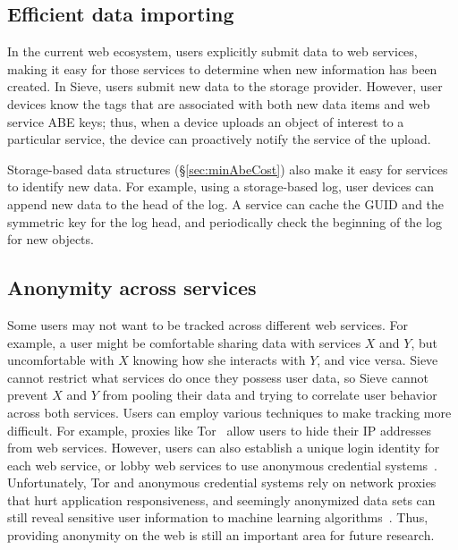 \subsection{Efficient data importing} 
In the
current web ecosystem, users explicitly submit
data to web services, making it easy for those
services to determine when new information
has been created. In Sieve, users submit new
data to the storage provider. However, user
devices know the tags that are associated
with both new data items and web service ABE
keys; thus, when a device uploads an object
of interest to a particular service, the device
can proactively notify the service of the upload.

Storage-based data structures (\S\ref{sec:minAbeCost})
also make it easy for services to identify new
data. For example, using a storage-based log,
user devices can append new data to the head of
the log. A service can cache the GUID and the
symmetric key for the log head, and periodically
check the beginning of the log for new objects.

\subsection{Anonymity across services} 
Some users may not want to be tracked across
different web services. For example, a user
might be comfortable sharing data with services
$X$ and $Y$, but uncomfortable with $X$ knowing
how she interacts with $Y$, and vice versa.
Sieve cannot restrict what services do once
they possess user data, so Sieve cannot prevent
$X$ and $Y$ from pooling their data and trying
to correlate user behavior across both services.
Users can employ various techniques to make
tracking more difficult. For example, proxies
like Tor~\cite{tor} allow users to hide their
IP addresses from web services. However, users can also
establish a unique login identity for each web
service, or lobby web services to use anonymous
credential systems~\cite{camenisch2001efficient}. 
Unfortunately, Tor and anonymous credential
systems rely on network proxies that hurt
application responsiveness, and seemingly
anonymized data sets can still reveal sensitive
user information to machine learning algorithms~\cite{dwork2011differential}.
Thus, providing anonymity on the web is still
an important area for future research.

